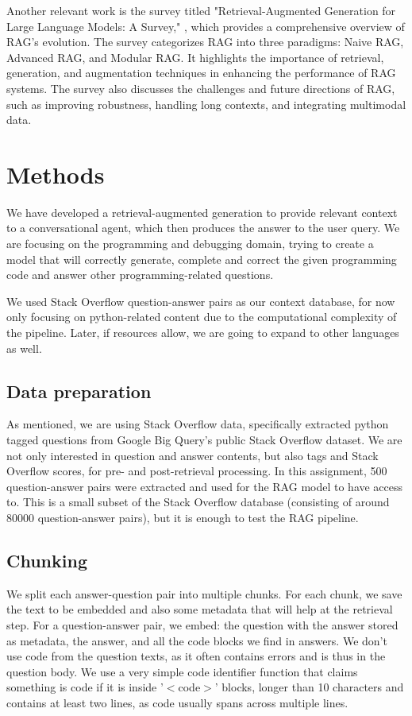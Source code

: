 \documentclass[fleqn,moreauthors,10pt]{ds_report}
\begin{document}
Another relevant work is the survey titled "Retrieval-Augmented Generation for Large Language Models: A Survey," \cite{gao2024retrievalaugmentedgenerationlargelanguage}, which provides a comprehensive overview of RAG's evolution. The survey categorizes RAG into three paradigms: Naive RAG, Advanced RAG, and Modular RAG. It highlights the importance of retrieval, generation, and augmentation techniques in enhancing the performance of RAG systems. The survey also discusses the challenges and future directions of RAG, such as improving robustness, handling long contexts, and integrating multimodal data.
	


\section*{Methods}
We have developed a retrieval-augmented generation to provide relevant context to a conversational agent, which then produces the answer to the user query. We are focusing on the programming and debugging domain, trying to create a model that will correctly generate, complete and correct the given programming code and answer other programming-related questions. 

We used Stack Overflow \cite{StackOverflow} question-answer pairs as our context database, for now only  focusing on python-related content due to the computational complexity of the pipeline. Later, if resources allow, we are going to expand to other languages as well.

\subsection*{Data preparation}
As mentioned, we are using Stack Overflow data, specifically extracted python tagged questions from Google Big Query's public Stack Overflow dataset. We are not only  interested in question and answer contents, but also tags and Stack Overflow scores, for pre- and post-retrieval processing. In this assignment, 500 question-answer pairs were extracted and used for the RAG model to have access to. This is a small subset of the Stack Overflow database (consisting of around 80000 question-answer pairs), but it is enough to test the RAG pipeline. 

\subsection*{Chunking}
We split each answer-question pair into multiple chunks. For each chunk, we save the text to be embedded and also some metadata that will help at the retrieval step. For a question-answer pair, we embed: the question with the answer stored as metadata, the answer, and all the code blocks we find in answers. We don't use code from the question texts, as it often contains errors and is thus in the question body. We use a very simple code identifier function that claims something is code if it is inside '$<$code$>$' blocks, longer than 10 characters and contains at least two lines, as code usually spans across multiple lines. 
\end{document}
